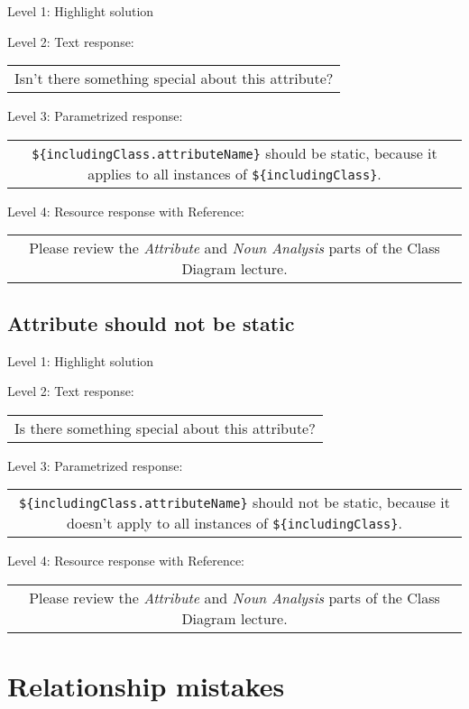 \noindent Level 1: Highlight solution \medskip

\noindent Level 2: Text response: \medskip

\begin{tabular}{|c}
Isn't there something special about this attribute?
\end{tabular} \medskip

\noindent Level 3: Parametrized response: \medskip

\begin{tabular}{|c}
\verb|${includingClass.attributeName}| should be static, because it applies to all instances of \verb|${includingClass}|.
\end{tabular} \medskip

\noindent Level 4: Resource response with Reference:

\begin{tabular}{|c}
Please review the \textit{Attribute} and \textit{Noun Analysis} parts of the Class Diagram lecture.
\end{tabular} \medskip


\subsection{Attribute should not be static}

\noindent Level 1: Highlight solution \medskip

\noindent Level 2: Text response: \medskip

\begin{tabular}{|c}
Is there something special about this attribute?
\end{tabular} \medskip

\noindent Level 3: Parametrized response: \medskip

\begin{tabular}{|c}
\verb|${includingClass.attributeName}| should not be static, because it doesn't apply to all instances of \verb|${includingClass}|.
\end{tabular} \medskip

\noindent Level 4: Resource response with Reference:

\begin{tabular}{|c}
Please review the \textit{Attribute} and \textit{Noun Analysis} parts of the Class Diagram lecture.
\end{tabular} \medskip



\section{Relationship mistakes}

